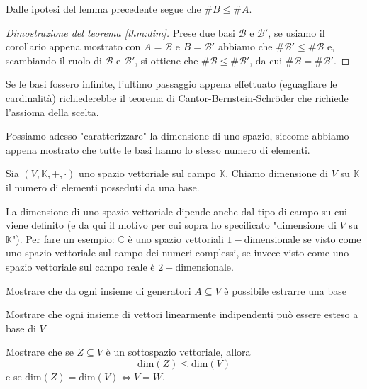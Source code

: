 \begin{cor}
    Dalle ipotesi del lemma precedente segue che $\# B \leq \# A$.
\end{cor}
\begin{proof}[Dimostrazione del teorema \ref{thm:dim}]
    Prese due basi $\mathcal{B}$ e $\mathcal{B'}$, se usiamo il corollario appena mostrato con $A = \mathcal{B}$ e $B = \mathcal{B'}$ abbiamo che $\# \mathcal{B'} \leq \# \mathcal{B}$ e, scambiando il ruolo di $\mathcal{B}$ e $\mathcal{B'}$, si ottiene che $\# \mathcal{B} \leq \# \mathcal{B'}$, da cui $\# \mathcal{B} = \# \mathcal{B'}$.
\end{proof}
\begin{remark}
    Se le basi fossero infinite, l'ultimo passaggio appena effettuato (eguagliare le cardinalità) richiederebbe il teorema di Cantor-Bernstein-Schr{\"o}der che richiede l'assioma della scelta. 
\end{remark}
Possiamo adesso "caratterizzare" la dimensione di uno spazio, siccome abbiamo appena mostrato che tutte le basi hanno lo stesso numero di elementi.
\begin{definition}[dimensione]
    Sia $(V, \mathbb{K}, +, \cdot)$ uno spazio vettoriale sul campo $\mathbb{K}$. Chiamo dimensione di $V$ su $\mathbb{K}$ il numero di elementi posseduti da una base.
\end{definition}
\begin{remark}
    La dimensione di uno spazio vettoriale dipende anche dal tipo di campo su cui viene definito (e da qui il motivo per cui sopra ho specificato "dimensione di $V$ su $\mathbb{K}$"). Per fare un esempio: $\mathbb{C}$ è uno spazio vettoriali $1-$dimensionale se visto come uno spazio vettoriale sul campo dei numeri complessi, se invece visto come uno spazio vettoriale sul campo reale è $2-$dimensionale.
\end{remark}
\begin{exercise}
    Mostrare che da ogni insieme di generatori $A \subseteq V$ è possibile estrarre una base
    \label{ex:1.7}
\end{exercise}
\begin{exercise}
    Mostrare che ogni insieme di vettori linearmente indipendenti può essere esteso a base di $V$
    \label{ex:1.8}
\end{exercise}
\begin{exercise}
    Mostrare che se $Z \subseteq V$ è un sottospazio vettoriale, allora
    $$
        \text{dim}(Z) \leq \text{dim}(V)
    $$
    e se $\text{dim}(Z) = \text{dim}(V) \iff V = W$.
    \label{ex:1.9}
\end{exercise}

